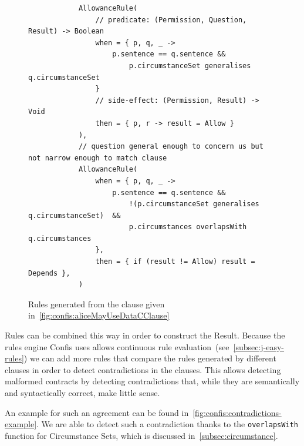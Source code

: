 \begin{figure}[h]
    \centering
    \begin{verbatim}
            AllowanceRule(
                // predicate: (Permission, Question, Result) -> Boolean
                when = { p, q, _ ->
                    p.sentence == q.sentence &&
                        p.circumstanceSet generalises q.circumstanceSet
                }
                // side-effect: (Permission, Result) -> Void
                then = { p, r -> result = Allow }
            ),
            // question general enough to concern us but not narrow enough to match clause
            AllowanceRule(
                when = { p, q, _ ->
                    p.sentence == q.sentence &&
                        !(p.circumstanceSet generalises q.circumstanceSet)  &&
                        p.circumstances overlapsWith q.circumstances
                },
                then = { if (result != Allow) result = Depends },
            )
    \end{verbatim}
    \caption{Rules generated from the clause given in~\autoref{fig:confis:aliceMayUseDataCClause}}
    \label{fig:confis:aliceMayUseDataRule}
\end{figure}

Rules can be combined this way in order to construct the Result.
Because the rules engine Confis uses allows continuous rule evaluation~(see~\autoref{subsec:j-easy-rules}) we can add more rules that compare the rules generated by different clauses in order to detect contradictions in the clauses.
This allows detecting malformed contracts by detecting contradictions that, while they are semantically and syntactically correct, make little sense.

An example for such an agreement can be found in~\autoref{fig:confis:contradictions-example}.
We are able to detect such a contradiction thanks to the \texttt{overlapsWith} function for Circumstance Sets, which is discussed in~\autoref{subsec:circumstance}.


